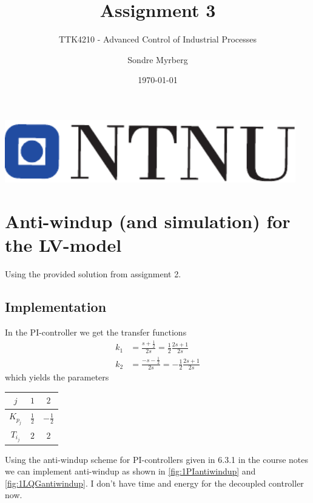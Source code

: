 \documentclass[a4paper]{scrartcl}
\title{Assignment 3}
\subtitle{TTK4210 - Advanced Control of Industrial Processes}
\author{Sondre Myrberg}
\date{\today}
\begin{document}
\hypersetup{pageanchor=false}
\begin{titlepage}
    \maketitle
    \vfill
    \vfill
    \vfill
    \vfill
    \vfill
    \includegraphics[width=0.95\textwidth]{../ntnu_logo.pdf}
    \vfill
    \vfill
\end{titlepage}
\hypersetup{pageanchor=true}

\section{Anti-windup (and simulation) for the LV-model}
Using the provided solution from assignment 2.
\subsection{Implementation}
In the PI-controller we get the transfer functions
\begin{equation}
	\begin{aligned}
		k_1 &= \frac{s+\tfrac{1}{2}}{2s} = \frac{1}{2} \frac{2s+1}{2s}\\
		k_2 &= \frac{-s-\tfrac{1}{2}}{2s} = -\frac{1}{2} \frac{2s+1}{2s}
	\end{aligned}
\end{equation}
which yields the parameters
\begin{center}
	\begin{tabular}{c|c|c}
		$j$ & $1$ & $2$ \\ \hline
		$K_{p_j}$ & $\frac{1}{2}$ & $-\frac{1}{2}$\\
		$T_{i_j}$ & $2$ & $2$
	\end{tabular}
\end{center}
Using the anti-windup scheme for PI-controllers given in 6.3.1 in the course notes we can implement anti-windup as shown in \autoref{fig:1PIantiwindup} and \autoref{fig:1LQGantiwindup}. I don't have time and energy for the decoupled controller now.
\end{document}

